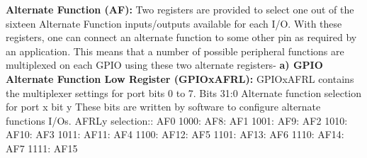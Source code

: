 \documentclass{article}
\begin{document}
\textbf{Alternate Function (AF): } Two registers are provided to select one out of the sixteen Alternate Function inputs/outputs available for each I/O. With these registers, one can connect an alternate function to some other pin as required by an application. This means that a number of possible peripheral functions are multiplexed on each GPIO using these two alternate registers-\newline\newline
\textbf{a) GPIO Alternate Function Low Register (GPIOx\textunderscore AFRL): } GPIOx\textunderscore AFRL contains the multiplexer settings for port bits 0 to 7.\newline\newline
Bits 31:0 Alternate function selection for port x bit y\newline\newline
These bits are written by software to configure alternate functions I/Os.\newline\newline
AFRLy selection:\newline{}: AF0 1000: AF8\newline{}: AF1 1001: AF9\newline{}: AF2 1010: AF10\newline{}: AF3 1011: AF11\newline{}: AF4 1100: AF12\newline{}: AF5 1101: AF13\newline{}: AF6 1110: AF14\newline{}: AF7 1111: AF15\newline\newline
\end{document}
